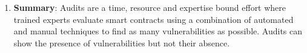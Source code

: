 \begin{enumerate}
\item\textbf{Summary}: Audits are a time, resource and expertise bound effort where trained experts evaluate smart contracts using a combination of automated and manual techniques to find as many vulnerabilities as possible. Audits can show the presence of vulnerabilities but not their absence.

\end{enumerate}
